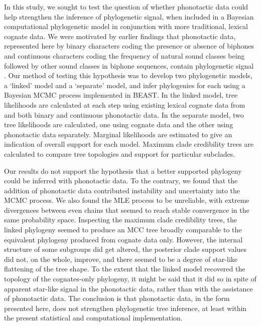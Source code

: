 \documentclass[]{article}
\begin{document}
In this study, we sought to test the question of whether phonotactic data could help strengthen the inference of phylogenetic signal, when included in a Bayesian computational phylogenetic model in conjunction with more traditional, lexical cognate data. We were motivated by earlier findings that phonotactic data, represented here by binary characters coding the presence or absence of biphones and continuous characters coding the frequency of natural sound classes being followed by other sound classes in biphone sequences, contain phylogenetic signal \autocite{macklin-cordes_phylogenetic_2021}. Our method of testing this hypothesis was to develop two phylogenetic models, a `linked' model and a `separate' model, and infer phylogenies for each using a Bayesian MCMC process implemented in BEAST. In the linked model, tree likelihoods are calculated at each step using existing lexical cognate data from \textcite{bouckaert_origin_2018} and both binary and continuous phonotactic data. In the separate model, two tree likelihoods are calculated, one using cognate data and the other using phonotactic data separately. Marginal likelihoods are estimated to give an indication of overall support for each model. Maximum clade credibility trees are calculated to compare tree topologies and support for particular subclades.

Our results do not support the hypothesis that a better supported phylogeny could be inferred with phonotactic data. To the contrary, we found that the addition of phonotactic data contributed instability and uncertainty into the MCMC process. We also found the MLE process to be unreliable, with extreme divergences between even chains that seemed to reach stable convergence in the same probability space. Inspecting the maximum clade credibility trees, the linked phylogeny seemed to produce an MCC tree broadly comparable to the equivalent phylogeny produced from cognate data only. However, the internal structure of some subgroups did get altered, the posterior clade support values did not, on the whole, improve, and there seemed to be a degree of star-like flattening of the tree shape. To the extent that the linked model recovered the topology of the cognates-only phylogeny, it might be said that it did so in spite of apparent star-like signal in the phonotactic data, rather than with the assistance of phonotactic data. The conclusion is that phonotactic data, in the form presented here, does not strengthen phylogenetic tree inference, at least within the present statistical and computational implementation.
\end{document}
